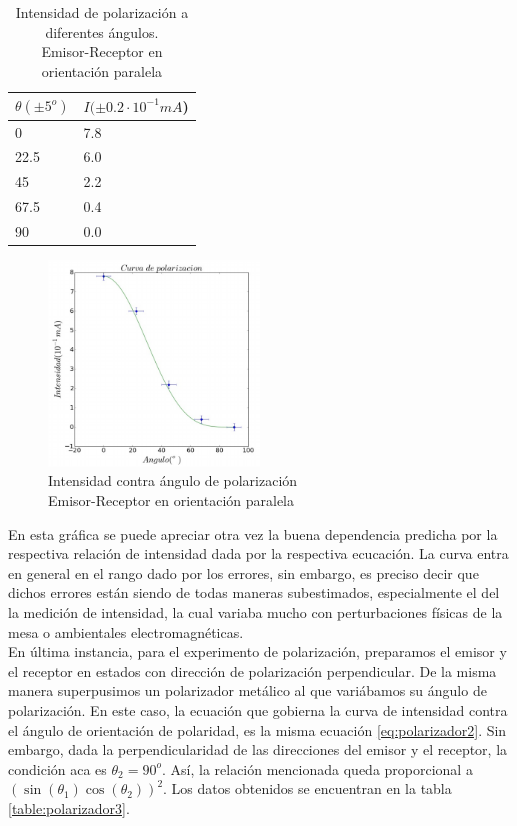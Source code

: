 \documentclass[prb,aps,twocolumn,preprintnumbers,amsmath,amssymb]{revtex4}
\begin{document}
\begin{table}[h!]
	\caption{\label{table:polarizador2}Intensidad de polarización a diferentes ángulos.\\ Emisor-Receptor en orientación paralela}
	\begin{ruledtabular}
	\begin{tabular}{|M{3.5cm}|M{4.5cm}|}
		$ \theta (\pm 5^o) $ & $ I(\pm 0.2\cdot 10^{-1}mA  $)  \\ 
		  &  7.8\\
		22.5 &  6.0\\ 
		45 &  2.2\\ 
		67.5 &  0.4\\ 
		90 &  0.0\\ 
	\end{tabular}  
	\end{ruledtabular}
\end{table}

\begin{figure}[h!]
	\centering
	\includegraphics[width=0.5\textwidth]{polarizer22}
	\caption{Intensidad contra ángulo de polarización \\ Emisor-Receptor en orientación paralela}
	\label{fig:polarizador22}
\end{figure}

En esta gráfica se puede apreciar otra vez la buena dependencia predicha por la respectiva relación de intensidad dada por la respectiva ecucación. La curva entra en general en el rango dado por los errores, sin embargo, es preciso decir que dichos errores están siendo de todas maneras subestimados, especialmente el del la medición de intensidad, la cual variaba mucho con perturbaciones físicas de la mesa o ambientales electromagnéticas.\\

En última instancia, para el experimento de polarización, preparamos el emisor y el receptor en estados con dirección de polarización perpendicular. De la misma manera superpusimos un polarizador metálico al que variábamos su ángulo de polarización. En este caso, la ecuación que gobierna la curva de intensidad contra el ángulo de orientación de polaridad, es la misma ecuación \ref{eq:polarizador2}. Sin embargo, dada la perpendicularidad de las direcciones del emisor y el receptor, la condición aca es $\theta_2 = 90^o$. Así, la relación mencionada queda proporcional a $\left(\sin{(\theta_1)}\cos{(\theta_2)}\right)^2$. Los datos obtenidos se encuentran en la tabla \ref{table:polarizador3}.\\
\end{document}
